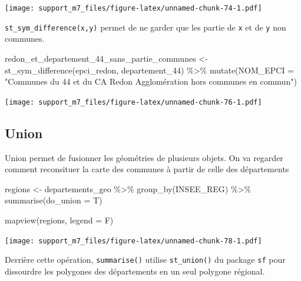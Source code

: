 \documentclass[
]{book}
\newenvironment{Shaded}{\begin{snugshade}}{\end{snugshade}}
\newcommand{\AttributeTok}[1]{\textcolor[rgb]{0.77,0.63,0.00}{#1}}
\newcommand{\FunctionTok}[1]{\textcolor[rgb]{0.00,0.00,0.00}{#1}}
\newcommand{\NormalTok}[1]{#1}
\newcommand{\OtherTok}[1]{\textcolor[rgb]{0.56,0.35,0.01}{#1}}
\newcommand{\SpecialCharTok}[1]{\textcolor[rgb]{0.00,0.00,0.00}{#1}}
\newcommand{\StringTok}[1]{\textcolor[rgb]{0.31,0.60,0.02}{#1}}
\begin{document}
\texttt{[image: support\_m7\_files/figure-latex/unnamed-chunk-74-1.pdf]}

\texttt{st\_sym\_difference(x,y)} permet de ne garder que les partie de \texttt{x} et de \texttt{y} non communes.

\begin{Shaded}
\begin{Highlighting}[]
\NormalTok{redon\_et\_departement\_44\_sans\_partie\_communes }\OtherTok{\textless{}{-}} \FunctionTok{st\_sym\_difference}\NormalTok{(epci\_redon, departement\_44) }\SpecialCharTok{\%\textgreater{}\%}
  \FunctionTok{mutate}\NormalTok{(}\AttributeTok{NOM\_EPCI =} \StringTok{"Communes du 44 et du CA Redon Agglomération hors communes en commun"}\NormalTok{)}
\end{Highlighting}
\end{Shaded}

\texttt{[image: support\_m7\_files/figure-latex/unnamed-chunk-76-1.pdf]}

\hypertarget{union}{%
\subsection{Union}\label{union}}

Union permet de fusionner les géométries de plusieurs objets.
On va regarder comment reconsituer la carte des communes à partir de celle des départements

\begin{Shaded}
\begin{Highlighting}[]
\NormalTok{regions }\OtherTok{\textless{}{-}}\NormalTok{ departements\_geo }\SpecialCharTok{\%\textgreater{}\%}
  \FunctionTok{group\_by}\NormalTok{(INSEE\_REG) }\SpecialCharTok{\%\textgreater{}\%}
  \FunctionTok{summarise}\NormalTok{(}\AttributeTok{do\_union =}\NormalTok{ T)}
\end{Highlighting}
\end{Shaded}

\begin{Shaded}
\begin{Highlighting}[]
\FunctionTok{mapview}\NormalTok{(regions, }\AttributeTok{legend =}\NormalTok{ F)}
\end{Highlighting}
\end{Shaded}

\texttt{[image: support\_m7\_files/figure-latex/unnamed-chunk-78-1.pdf]}

Derrière cette opération, \texttt{summarise()} utilise \texttt{st\_union()} du package \texttt{sf} pour dissourdre les polygones des départements en un seul polygone régional.
\end{document}
